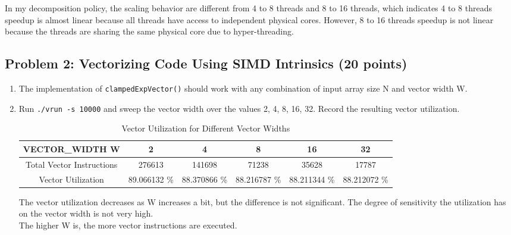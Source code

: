 \documentclass[letterpaper,11pt]{exam}
\begin{document}
\begin{questions}
\begin{enumerate}[label=\roman*.]
              In my decomposition policy, the scaling behavior are different from 4 to 8 threads and 8 to 16 threads, which indicates 4 to 8 threads speedup is almost linear because all threads have access to independent physical cores. However, 8 to 16 threads speedup is not linear because the threads are sharing the same physical core due to hyper-threading.
    \end{enumerate}

    \newpage

    \question
    \subsection*{Problem 2: Vectorizing Code Using SIMD Intrinsics (20 points)}

    \begin{enumerate}[label=\roman*.]
        \item The implementation of \texttt{clampedExpVector()} should work with any combination of input
              array size N and vector width W.
        \item Run \texttt{./vrun -s 10000} and sweep the vector width over the values {2, 4, 8, 16, 32}.
              Record the resulting vector utilization.

              \begin{table}[ht]
                  \centering
                  \scriptsize
                  \begin{tabular}{|c|c|c|c|c|c|}
                      \hline
                      VECTOR\_WIDTH W           & 2            & 4            & 8            & 16           & 32           \\ \hline
                      Total Vector Instructions & 276613       & 141698       & 71238        & 35628        & 17787        \\ \hline
                      Vector Utilization        & 89.066132 \% & 88.370866 \% & 88.216787 \% & 88.211344 \% & 88.212072 \% \\ \hline
                  \end{tabular}
                  \caption{Vector Utilization for Different Vector Widths}
              \end{table}

              The vector utilization decreases as W increases a bit, but the difference is not significant. The degree of sensitivity the utilization has on the vector width is not very high. \\
              The higher W is, the more vector instructions are executed.


\end{enumerate}
\end{questions}
\end{document}
